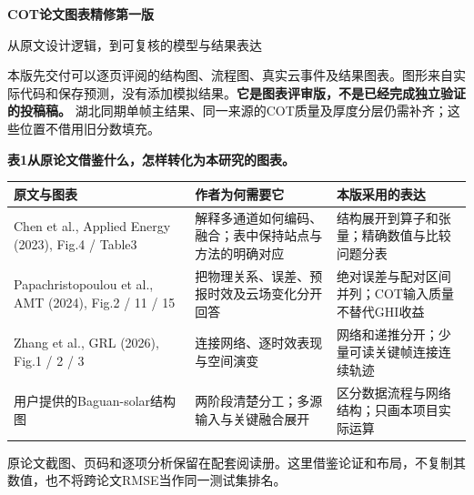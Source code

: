 \documentclass[UTF8,a4paper,10pt,fontset=none]{ctexart}
\begin{document}
\color{ink}
{\color{accent}\sffamily\bfseries\fontsize{27}{32}\selectfont COT论文\quad 图表精修第一版}\par
{\sffamily\large 从原文设计逻辑，到可复核的模型与结果表达}\par
\vspace{3mm}
本版先交付可以逐页评阅的结构图、流程图、真实云事件及结果图表。图形来自实际代码和保存预测，没有添加模拟结果。\textbf{它是图表评审版，不是已经完成独立验证的投稿稿。} 湖北同期单帧主结果、同一来源的COT质量及厚度分层仍需补齐；这些位置不借用旧分数填充。

\textbf{表1\quad 从原论文借鉴什么，怎样转化为本研究的图表。}\par
\begin{tabularx}{\linewidth}{p{49mm}YY}\toprule
原文与图表 & 作者为何需要它 & 本版采用的表达\\\midrule
Chen et al., Applied Energy (2023), Fig.4 / Table3 & 解释多通道如何编码、融合；表中保持站点与方法的明确对应 & 结构展开到算子和张量；精确数值与比较问题分表\\
Papachristopoulou et al., AMT (2024), Fig.2 / 11 / 15 & 把物理关系、误差、预报时效及云场变化分开回答 & 绝对误差与配对区间并列；COT输入质量不替代GHI收益\\
Zhang et al., GRL (2026), Fig.1 / 2 / 3 & 连接网络、逐时效表现与空间演变 & 网络和递推分开；少量可读关键帧连接连续轨迹\\
用户提供的Baguan-solar结构图 & 两阶段清楚分工；多源输入与关键融合展开 & 区分数据流程与网络结构；只画本项目实际运算\\\bottomrule\end{tabularx}
原论文截图、页码和逐项分析保留在配套阅读册。这里借鉴论证和布局，不复制其数值，也不将跨论文RMSE当作同一测试集排名。
\end{document}

